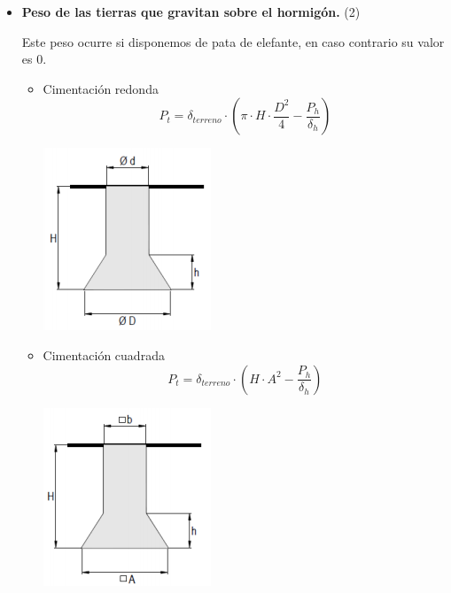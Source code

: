 \documentclass{article}
\begin{document}
\begin{itemize}
                \newpage
                \item\textbf{ Peso de las tierras que gravitan sobre el hormigón.} (2)
                
                Este peso ocurre si disponemos de pata de elefante, en caso contrario su valor es 0.
                
                \begin{itemize}
                        \item Cimentación redonda
                        \begin{equation*}
                        P_t = \delta_{terreno} \cdot \left(\pi\cdot H \cdot \frac{D^2}{4} - \frac{P_h}{\delta_h} \right)
                        \end{equation*}
                        \begin{center}
                            \includegraphics[scale = 0.5]{assets/img/Patas Separadas/cimentacion circular.png}
                        \end{center}
                        \item Cimentación cuadrada
                         \begin{equation*}
                        P_t = \delta_{terreno} \cdot \left(H \cdot A^2 - \frac{P_h}{\delta_h} \right)
                        \end{equation*}
                        \begin{center}
                            \includegraphics[scale = 0.5]{assets/img/Patas Separadas/cimentacion cuadrada.png}
                        \end{center}
                    \end{itemize}
                

\end{itemize}
\end{document}
